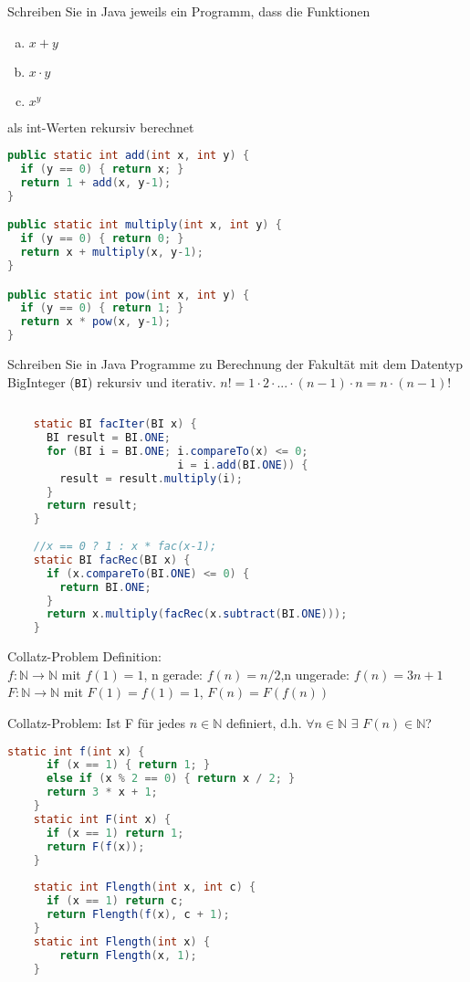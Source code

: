 \begin{card}
	Schreiben Sie in Java jeweils ein Programm, dass die Funktionen
	\begin{enumerate}[a)]
	\item $x+y$
	\item $x \cdot y$
	\item $x^y$
	\end{enumerate}
	als int-Werten rekursiv berechnet
	\hr
	\begin{lstlisting}[language=Java]
public static int add(int x, int y) {
  if (y == 0) { return x; }
  return 1 + add(x, y-1);
}

public static int multiply(int x, int y) {
  if (y == 0) { return 0; }
  return x + multiply(x, y-1);
}

public static int pow(int x, int y) {
  if (y == 0) { return 1; }
  return x * pow(x, y-1);
}
	\end{lstlisting}
\end{card}

\begin{card}
	Schreiben Sie in Java Programme zu Berechnung der Fakultät mit dem Datentyp BigInteger (\texttt{BI}) rekursiv und iterativ.
	\hr
	$n! = 1 \cdot 2 \cdot ... \cdot (n-1) \cdot n = n  \cdot  (n-1)!$
	\begin{lstlisting}[language=Java]
	
	static BI facIter(BI x) {
	  BI result = BI.ONE;
	  for (BI i = BI.ONE; i.compareTo(x) <= 0;
	                      i = i.add(BI.ONE)) {
	    result = result.multiply(i);
	  }
	  return result;
	}
	
	//x == 0 ? 1 : x * fac(x-1);
	static BI facRec(BI x) {
	  if (x.compareTo(BI.ONE) <= 0) {
	    return BI.ONE;
	  }
	  return x.multiply(facRec(x.subtract(BI.ONE)));
	}
	\end{lstlisting}
\end{card}

\begin{card}
	Collatz-Problem Definition:\\
	$f: \mathbb{N} \rightarrow \mathbb{N}$ mit
	$f(1) = 1$, n gerade: $f(n) = n / 2$,n ungerade: $f(n) = 3n + 1$\\
	$F: \mathbb{N} \rightarrow \mathbb{N}$ mit $F(1) = f(1)  = 1$, $F(n) = F(f(n))$

	Collatz-Problem: Ist F für jedes $n \in \mathbb{N}$  definiert, d.h. $\forall n \in \mathbb{N}$ $\exists$ $F(n) \in \mathbb{N}$?
	\hr
	\begin{lstlisting}[language=Java]
	static int f(int x) {
	  if (x == 1) { return 1; }
	  else if (x % 2 == 0) { return x / 2; }
	  return 3 * x + 1;
	}
	static int F(int x) {
	  if (x == 1) return 1;
	  return F(f(x));
	}
	
	static int Flength(int x, int c) {
	  if (x == 1) return c;
	  return Flength(f(x), c + 1);
	}
	static int Flength(int x) {
		return Flength(x, 1);
	}
	\end{lstlisting}
\end{card}

